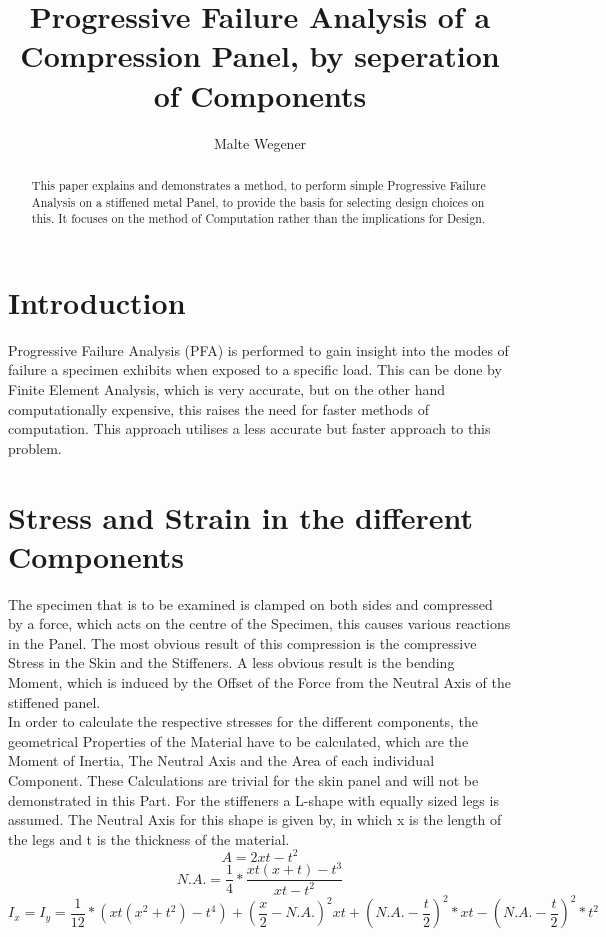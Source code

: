 \documentclass{article}
\title{Progressive Failure Analysis of a Compression Panel, by seperation of Components}
\author{Malte Wegener}
\begin{document}
	\maketitle
	\begin{abstract}
		This paper explains and demonstrates a method, to perform simple Progressive Failure Analysis on
		a stiffened metal Panel, to provide the basis for selecting design choices on this. It focuses on the method of Computation rather than the implications for Design.
	\end{abstract}

	\section{Introduction}
	Progressive Failure Analysis (PFA) is performed to gain insight into the modes of failure a specimen exhibits when exposed to a specific load. This can be done by Finite Element Analysis, which is very accurate, but on the other hand computationally expensive, this raises the need for faster methods of computation. This approach utilises a less accurate but faster approach to this problem.
	
	\section{Stress and Strain in the different Components}
	The specimen that is to be examined is clamped on both sides and compressed by a force, which acts on the centre of the Specimen, this causes various reactions in the Panel. The most obvious result of this compression is the compressive Stress in the Skin and the Stiffeners. A less obvious result is the bending Moment, which is induced by the Offset of the Force from the Neutral Axis of the stiffened panel.\\
	In order to calculate the respective stresses for the different components, the geometrical Properties of the Material have to be calculated, which are the Moment of Inertia, The Neutral Axis and the Area of each individual Component. These Calculations are trivial for the skin panel and will not be demonstrated in this Part. For the stiffeners a L-shape with equally sized legs is assumed. The Neutral Axis for this shape is given by, in which x is the length of the legs and t is the thickness of the material.\\
	\begin{equation} \label{Area of Stiffener}
		A = 2xt-t^2
	\end{equation}
	\begin{equation} \label{Neutral Axis of a Stiffener}
		N.A. = \frac{1}{4}*\frac{xt(x+t)-t^3}{xt-t^2}
	\end{equation}
	\begin{equation} \label{Moment of Inertia of a Stiffener}
		I_x = I_y = \frac{1}{12}*(xt(x^2+t^2)-t^4)+(\frac{x}{2}-N.A.)^2xt+(N.A.-\frac{t}{2})^2*xt-(N.A.-\frac{t}{2})^2*t^2
	\end{equation}
	
\end{document}
